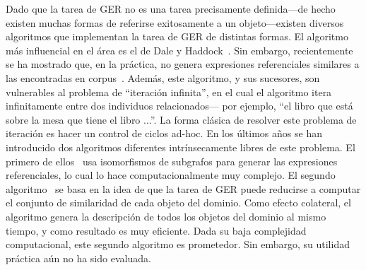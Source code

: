 Dado que la tarea de GER no es una tarea precisamente definida---de hecho existen muchas formas de referirse exitosamente a un objeto---existen diversos algoritmos que implementan la tarea de GER de distintas formas. El algoritmo m\'as influencial en el \'area es el de Dale y Haddock~\cite{DaleRobertandHaddock1991}. Sin embargo, recientemente se ha mostrado que, en la pr\'actica, no genera expresiones referenciales similares a las encontradas en corpus~\cite{Dale2009}. Adem\'as, este algoritmo, y sus sucesores, son vulnerables al problema de ``iteraci\'on infinita'', en el cual el algoritmo itera infinitamente entre dos individuos relacionados--- por ejemplo, ``el libro que est\'a sobre la mesa que tiene el libro ...''.  La forma cl\'asica de resolver este problema de iteraci\'on es hacer un control de ciclos ad-hoc. En los \'ultimos a\~nos se han introducido dos algoritmos diferentes intr\'insecamente libres de este problema. El primero de ellos~\cite{Krahmer2003} usa isomorfismos de subgrafos para generar las expresiones referenciales, lo cual lo hace computacionalmente muy complejo. El segundo algoritmo~\cite{Areces2008} se basa en la idea de que la tarea de GER puede reducirse a computar el conjunto de similaridad de cada objeto del dominio. Como efecto colateral, el algoritmo genera la descripci\'on de todos los objetos del dominio al mismo tiempo, y como resultado es muy eficiente. Dada su baja complejidad computacional, este segundo algoritmo es prometedor. Sin embargo, su utilidad pr\'actica a\'un no ha sido evaluada.  


   




 

